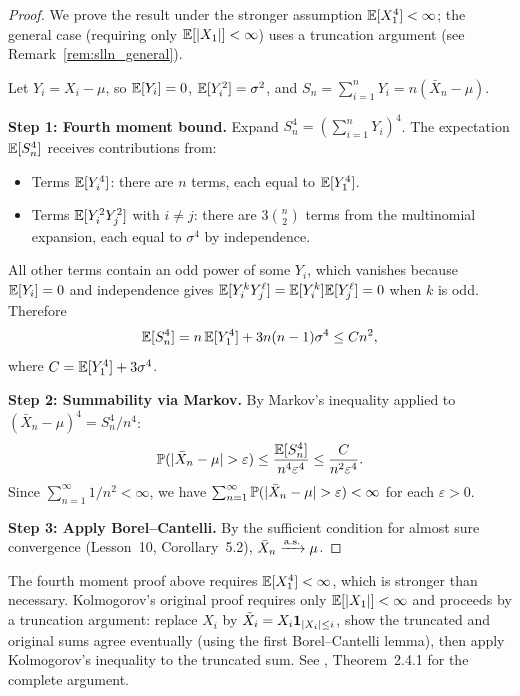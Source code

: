 \documentclass[11pt,a4paper]{article}
\begin{document}
\begin{proof}
We prove the result under the stronger assumption
$\mathbb{E}[X_1^4] < \infty$; the general case (requiring only
$\mathbb{E}[|X_1|] < \infty$) uses a truncation argument
(see Remark~\ref{rem:slln_general}).

Let $Y_i = X_i - \mu$, so $\mathbb{E}[Y_i] = 0$, $\mathbb{E}[Y_i^2] = \sigma^2$,
and $S_n = \sum_{i=1}^n Y_i = n(\bar{X}_n - \mu)$.

\textbf{Step 1: Fourth moment bound.}
Expand $S_n^4 = (\sum_{i=1}^n Y_i)^4$.  The expectation
$\mathbb{E}[S_n^4]$ receives contributions from:
\begin{itemize}[nosep]
  \item Terms $\mathbb{E}[Y_i^4]$: there are $n$ terms, each equal to
    $\mathbb{E}[Y_1^4]$.
  \item Terms $\mathbb{E}[Y_i^2 Y_j^2]$ with $i \neq j$: there are
    $3\binom{n}{2}$ terms from the multinomial expansion, each
    equal to $\sigma^4$ by independence.
\end{itemize}
All other terms contain an odd power of some $Y_i$, which
vanishes because $\mathbb{E}[Y_i] = 0$ and independence gives
$\mathbb{E}[Y_i^k Y_j^\ell] = \mathbb{E}[Y_i^k]\mathbb{E}[Y_j^\ell] = 0$ when $k$
is odd.  Therefore
\begin{equation}
  \mathbb{E}[S_n^4] = n\,\mathbb{E}[Y_1^4] + 3n(n-1)\sigma^4 \leq Cn^2,
  \label{eq:slln_fourth}
\end{equation}
where $C = \mathbb{E}[Y_1^4] + 3\sigma^4$.

\textbf{Step 2: Summability via Markov.}
By Markov's inequality applied to $(\bar{X}_n - \mu)^4 =
S_n^4/n^4$:
\begin{equation}
  \mathbb{P}(|\bar{X}_n - \mu| > \varepsilon)
  \leq \frac{\mathbb{E}[S_n^4]}{n^4 \varepsilon^4}
  \leq \frac{C}{n^2 \varepsilon^4}.
\end{equation}
Since $\sum_{n=1}^\infty 1/n^2 < \infty$, we have
$\sum_{n=1}^\infty \mathbb{P}(|\bar{X}_n - \mu| > \varepsilon)
< \infty$ for each $\varepsilon > 0$.

\textbf{Step 3: Apply Borel--Cantelli.}
By the sufficient condition for almost sure convergence
(Lesson~10, Corollary~5.2), $\bar{X}_n \xrightarrow{\text{a.s.}} \mu$.
\end{proof}

\begin{remark}
\label{rem:slln_general}
The fourth moment proof above requires $\mathbb{E}[X_1^4] < \infty$,
which is stronger than necessary.  Kolmogorov's original proof
requires only $\mathbb{E}[|X_1|] < \infty$ and proceeds by a truncation
argument: replace $X_i$ by $\tilde{X}_i = X_i \mathbf{1}_{|X_i|
\leq i}$, show the truncated and original sums agree eventually
(using the first Borel--Cantelli lemma), then apply Kolmogorov's
inequality to the truncated sum.  See
\citet{durrett2019}, Theorem~2.4.1 for the complete argument.
\end{remark}
\end{document}
